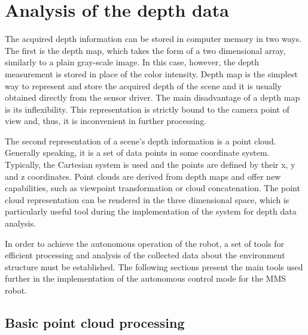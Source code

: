 \chapter{Analysis of the depth data}
\label{cha:analysis}

The acquired depth information can be stored in computer memory in two ways. The first is the depth map, which takes the form of a two dimensional array, similarly to a plain gray-scale image. In this case, however, the depth measurement is stored in place of the color intensity. Depth map is the simplest way to represent and store the acquired depth of the scene and it is usually obtained directly from the sensor driver. The main disadvantage of a depth map is its inflexibility. This representation is strictly bound to the camera point of view and, thus, it is inconvenient in further processing. 

The second representation of a scene's depth information is a point cloud. Generally speaking, it is a set of data points in some coordinate system. Typically, the Cartesian system is used and the points are defined by their x, y and z coordinates. Point clouds are derived from depth maps and offer new capabilities, such as viewpoint transformation or cloud concatenation. The point cloud representation can be rendered in the three dimensional space, which is particularly useful tool during the implementation of the system for depth data analysis. 


In order to achieve the autonomous operation of the robot, a set of tools for efficient processing and analysis of the collected data about the environment structure must be established. The following sections present the main tools used further in the implementation of the autonomous control mode for the MMS robot.




\section{Basic point cloud processing}
\label{sec:pointclouds}


